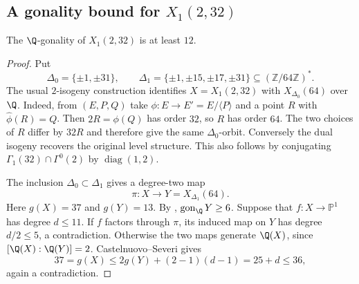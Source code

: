 \subsection{A gonality bound for $X_1(2,32)$}
\begin{lemma}\label{lem:decic232-gonality}
The $\Q$-gonality of $X_1(2,32)$ is at least $12$.
\end{lemma}
\begin{proof}
Put
\[
 \Delta_0=\{\pm1,\pm31\},\qquad
 \Delta_1=\{\pm1,\pm15,\pm17,\pm31\}
 \subseteq(\mathbb Z/64\mathbb Z)^*.
\]
The usual $2$-isogeny construction identifies $X=X_1(2,32)$
with $X_{\Delta_0}(64)$ over $\Q$.
Indeed, from $(E,P,Q)$ take $\phi:E\to E'=E/\langle P\rangle$
and a point $R$ with $\widehat\phi(R)=Q$. Then
$2R=\phi(Q)$ has order $32$, so $R$ has order $64$.
The two choices of $R$ differ by $32R$ and therefore give the
same $\Delta_0$-orbit. Conversely the dual isogeny recovers the
original level structure. This also follows by conjugating
$\Gamma_1(32)\cap\Gamma^0(2)$ by $\operatorname{diag}(1,2)$.

The inclusion $\Delta_0\subset\Delta_1$ gives a degree-two map
\[
 \pi:X\longrightarrow Y=X_{\Delta_1}(64).
\]
Here $g(X)=37$ and $g(Y)=13$. By
\cite[Proposition~3.7 and Table~2]{Orlic},
$\operatorname{gon}_{\Q}Y\geq6$.
Suppose that $f:X\to\mathbb P^1$ has degree $d\leq11$.
If $f$ factors through $\pi$, its induced map on $Y$ has degree
$d/2\leq5$, a contradiction. Otherwise the two maps generate
$\Q(X)$, since $[\Q(X):\Q(Y)]=2$.
Castelnuovo--Severi gives
\[
 37=g(X)\leq2g(Y)+(2-1)(d-1)=25+d\leq36,
\]
again a contradiction.
\end{proof}
